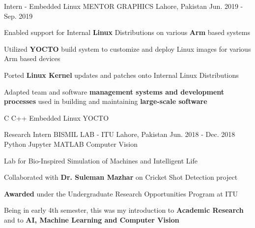 \begin{cventries}
  \cventry
    {Intern - Embedded Linux} %
    {MENTOR GRAPHICS} %
    {Lahore, Pakistan} %
    {Jun. 2019 - Sep. 2019} %
    {
      \begin{cvitems} %
        \item Enabled support for Internal \textbf{Linux} Distributions on various \textbf{Arm }based systems
        \item Utilized \textbf{YOCTO} build system to customize and deploy Linux images for various Arm based devices
        \item Ported \textbf{Linux Kernel} updates and patches onto Internal Linux Distributions
        \item Adapted team and software \textbf{management systems and development processes} used in building and maintaining \textbf{large-scale software}
      \end{cvitems}
    }
    {C \acvSep C++ \acvSep Embedded Linux \acvSep YOCTO}

  \cventry
    {Research Intern} %
    {BISMIL LAB - ITU} %
    {Lahore, Pakistan} %
    {Jun. 2018 - Dec. 2018} %
    {}
    {Python \acvSep Jupyter \acvSep MATLAB \acvSep Computer Vision}

    \cventry
    {Lab for Bio-Inspired Simulation of Machines and Intelligent Life} %
    {} %
    {} %
    {} %
    {
      \begin{cvitems} %
        \item Collaborated with \textbf{Dr. Suleman Mazhar} on Cricket Shot Detection project
        \item \textbf{Awarded} under the Undergraduate Research Opportunities Program at ITU
        \item Being in early 4th semester, this was my introduction to \textbf{Academic Research} and to \textbf{AI, Machine Learning and Computer Vision}
      \end{cvitems}
    }
    {}

\end{cventries}
